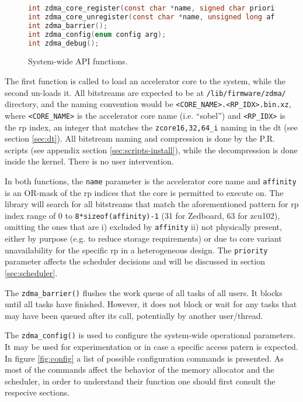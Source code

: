 \begin{figure}[H]
\centering
\begin{lstlisting}[style=basic,language=C]
int zdma_core_register(const char *name, signed char priority, unsigned long affinity);
int zdma_core_unregister(const char *name, unsigned long affinity);
int zdma_barrier();
int zdma_config(enum config arg);
int zdma_debug();
\end{lstlisting}
\caption{System-wide API functions.}
\label{lst:api-system}
\end{figure}

The first function is called to load an accelerator core to the system, while
the second un-loads it.
All bitstreams are expected to be at \texttt{/lib/firmware/zdma/} directory,
and the naming convention would be \texttt{<CORE\_NAME>.<RP\_IDX>.bin.xz},
where \texttt{<CORE\_NAME>} is the accelerator core name (i.e. ``sobel'')
and \texttt{<RP\_IDX>} is the \gls{rp} index, an integer that matches
the \texttt{zcore{16,32,64}\_i} naming in the \gls{dt} (see section \ref{sec:dt}).
All bitstream naming and compression is done by the P.R. scripts (see appendix section \ref{sec:scripts-install}),
while the decompression is done inside the kernel. There is no user intervention.

In both functions, the \texttt{name} parameter is the accelerator core name and 
\texttt{affinity} is an OR-mask of the \gls{rp} indices that the core is permitted to execute on.
The library will search for all bitstreams that match the aforementioned pattern for 
\gls{rp} index range of 0 to \texttt{8*sizeof(affinity)-1} (31 for Zedboard, 63 for zcu102),
omitting the ones that are i) excluded by \texttt{affinity} ii) not physically present,
either by purpose (e.g. to reduce storage requirements) or due to core variant unavailability for
the specific \gls{rp} in a heterogeneous design. The \texttt{priority} parameter affects
the scheduler decisions and will be discussed in section \ref{sec:scheduler}.

The \texttt{zdma\_barrier()} flushes the work queue of all tasks of all users.
It blocks until all tasks have finished. However, it does not block or wait for any
tasks that may have been queued after its call, potentially by another user/thread.

The \texttt{zdma\_config()} is used to configure the system-wide operational parameters.
It may be used for experimentation or in case a specific access patern is expected. 
In figure \ref{fig:config} a list of possible configuration commands is presented.
As most of the commands affect the behavior of the memory allocator and the scheduler,
in order to understand their function
one should first consult the respecive sections.

